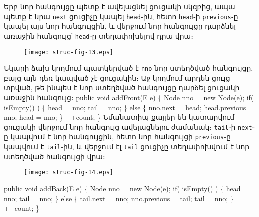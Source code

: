 Երբ նոր հանգույցը պետք է ավելացնել ցուցակի սկզբից, ապա
պետք է նրա \texttt{next} ցուցիչը կապել \texttt{head}֊ին, 
հետո \texttt{head}֊ի \texttt{previous}֊ը կապել այս նոր 
հանգույցին, և վերջում նոր հանգույցը դարձնել առաջին հանգույց՝ 
\texttt{head}֊ը տեղափոխելով դրա վրա։
\begin{figure}[h]
\centering
\texttt{[image: struc-fig-13.eps]}
\end{figure}
Նկարի ձախ կողմում պատկերված է \texttt{nno} նոր ստեղծված 
հանգույցը, բայց այն դեռ կապված չէ ցուցակին։ Աջ կողմում 
արդեն ցույց  տրված, թե ինպես է նոր ստեղծված հանգույցը
դարձել ցուցակի առաջին հանգույց։
\nwenddocs{}\endmoddef{}
public void addFront(E e)
\{
  Node nno = new Node(e);
  if( isEmpty() ) \{
    head = nno;
    tail = nno;
  \}
  else \{
    nno.next = head;
    head.previous = nno;
    head = nno;
  \}
  ++count;
\}
\nwendcode{}\nwdocspar
Նմանատիպ քայլեր են կատարվում ցուցակի վերջում նոր հանգույց 
ավելացնելու ժամանակ։ \texttt{tail}֊ի \texttt{next}֊ը կապվում 
է նոր հանգույցին, հետո նոր հանգույցի \texttt{previous}֊ը 
կապվում է \texttt{tail}֊ին, և վերջում էլ \texttt{tail} ցուցիչը 
տեղափոխվում է նոր ստեղծված հանգույցի վրա։
\begin{figure}[h]
\centering
\texttt{[image: struc-fig-14.eps]}
\end{figure}
\nwenddocs{}\endmoddef{}
public void addBack(E e)
\{
  Node nno = new Node(e);
  if( isEmpty() ) \{
    head = nno;
    tail = nno;
  \}
  else \{
    tail.next = nno;
    nno.previous = tail;
    tail = nno;
  \}
  ++count;
\}
\nwendcode{}\nwdocspar

%

